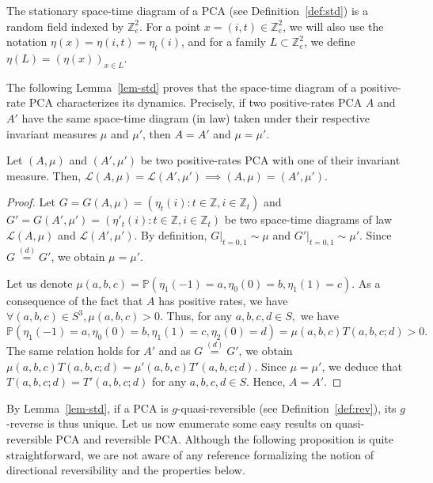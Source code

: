 \documentclass[AHL,Unicode,longabstracts]{cedram}
\newcounter{a}
\newcommand{\eqd}{\stackrel{(d)}{=}}
\newcommand{\ZZ}{\mathbb{Z}}
\newcommand{\Z}{\mathbb{Z}}
\newcommand{\Pbb}{\mathbb{P}}
\renewcommand{\L}{\mathcal{L}}
\let\oldforall\forall
\renewcommand*{\forall}{\mathrel{\oldforall}}
\begin{document}
The stationary space-time diagram of a PCA (see Definition~\ref{def:std}) is a random field indexed by $\Z_{e}^2$. For a point $x=(i,t)\in\Z_{e}^2$, we will also use the notation $\eta(x)=\eta(i,t)=\eta_t(i)$, and for a family $L\subset\Z_{e}^2$, we define $\eta(L)=(\eta(x))_{x\in L}$.

The following Lemma~\ref{lem-std} proves that the space-time diagram of a positive-rate PCA characterizes its dynamics. Precisely, if two positive-rates PCA $A$ and $A'$ have the same space-time diagram (in law) taken under their respective invariant measures $\mu$ and $\mu'$, then $A=A'$ and $\mu=\mu'$.

\begin{lemm}\label{lem-std}
Let $(A,\mu)$ and $(A',\mu')$ be two positive-rates PCA with one of their invariant measure. Then, $\L(A,\mu) = \L(A',\mu') \implies (A,\mu) = (A',\mu').$
\end{lemm}

\begin{proof}
Let $G=G(A,\mu)=(\eta_t(i) : t \in \ZZ, i \in \ZZ_t)$ and $G'=G(A',\mu')=(\eta'_t(i) : t \in \ZZ, i \in \ZZ_t)$ be two space-time diagrams of law $\L(A,\mu)$ and $\L(A',\mu')$. By definition, $G|_{t=0,1} \sim \mu$ and $G'|_{t=0,1} \sim \mu'$. Since $G \eqd G'$, we obtain $\mu = \mu'$.

Let us denote $\mu(a,b,c)=\Pbb\left(\eta_1(-1) = a, \eta_0(0) = b, \eta_1(1) = c\right)$. As a consequence of the fact that $A$ has positive rates, we have $\forall (a,b,c) \in S^3, \mu(a,b,c)> 0$.
Thus, for any $a,b,c,d\in S,$ we have
\[
\Pbb\left(\eta_1(-1) = a, \eta_0(0) = b, \eta_1(1) = c, \eta_2(0) = d\right) = \mu(a,b,c) T(a,b,c;d) > 0.
\]
The same relation holds for $A'$ and as $G \eqd G'$, we obtain $\mu(a,b,c) T(a,b,c;d)= \mu'(a,b,c) T'(a,b,c;d).$ Since $\mu=\mu'$, we deduce that $T(a,b,c;d) = T'(a,b,c;d)$ for any $a,b,c,d\in S$. Hence, $A=A'$.
\end{proof}

By Lemma~\ref{lem-std}, if a PCA is $g$-quasi-reversible (see Definition~\ref{def:rev}), its $g$-reverse is thus unique. Let us now enumerate some easy results on quasi-reversible PCA and reversible PCA. Although the following proposition is quite straightforward, we are not aware of any reference formalizing the notion of directional reversibility and the properties below.
\end{document}
